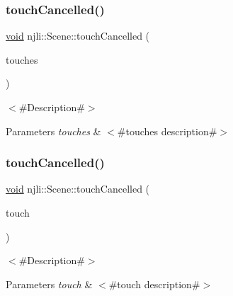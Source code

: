 \subsubsection{\texorpdfstring{touch\+Cancelled()}{touchCancelled()}\hspace{0.1cm}{\footnotesize\ttfamily [1/2]}}
{\footnotesize\ttfamily \mbox{\hyperlink{_thread_8h_af1e856da2e658414cb2456cb6f7ebc66}{void}} njli\+::\+Scene\+::touch\+Cancelled (\begin{DoxyParamCaption}\item[{\mbox{\hyperlink{classnjli_1_1_device_touch}{Device\+Touch}} $\ast$$\ast$}]{touches }\end{DoxyParamCaption})}

$<$\#\+Description\#$>$


\begin{DoxyParams}{Parameters}
{\em touches} & $<$\#touches description\#$>$ \\
\hline
\end{DoxyParams}
\mbox{\label{classnjli_1_1_scene_ad517760d7c2c0de588cfffb99bc225a6}} 
\subsubsection{\texorpdfstring{touch\+Cancelled()}{touchCancelled()}\hspace{0.1cm}{\footnotesize\ttfamily [2/2]}}
{\footnotesize\ttfamily \mbox{\hyperlink{_thread_8h_af1e856da2e658414cb2456cb6f7ebc66}{void}} njli\+::\+Scene\+::touch\+Cancelled (\begin{DoxyParamCaption}\item[{const \mbox{\hyperlink{classnjli_1_1_device_touch}{Device\+Touch}} \&}]{touch }\end{DoxyParamCaption})}

$<$\#\+Description\#$>$


\begin{DoxyParams}{Parameters}
{\em touch} & $<$\#touch description\#$>$ \\
\hline
\end{DoxyParams}
\mbox{\label{classnjli_1_1_scene_ac843c56be80b5c13c602cb324f38fc65}} 
